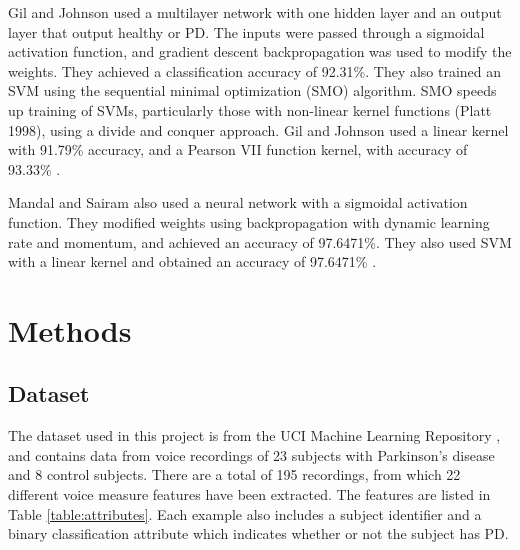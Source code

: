 \documentclass[draftcopy]{srpaper}
\begin{document}
Gil and Johnson used a multilayer network with one hidden layer
and an output layer that output healthy or PD. The inputs were passed
through a sigmoidal activation function, and gradient descent
backpropagation was used to modify the weights. They achieved a
classification accuracy of 92.31\%.
They also trained an SVM using the sequential minimal
optimization (SMO) algorithm. SMO speeds up training
of SVMs, particularly those with non-linear kernel functions (Platt
1998), using a divide and conquer approach. Gil and Johnson used a
linear kernel with 91.79\% accuracy, and a Pearson VII function
kernel, with accuracy of 93.33\% \cite{GJ70}.

Mandal and Sairam also used a neural network with a sigmoidal activation function. They modified weights using backpropagation with dynamic
learning rate and momentum, and achieved an accuracy of 97.6471\%.
They also used SVM with a linear kernel and obtained an
accuracy of 97.6471\% \cite{MS12}.

 \chapter{Methods}
 \label{Chapter:Three}

\section{Dataset}
The dataset used in this project is from the UCI Machine Learning
Repository \cite{Bache+Lichman:2013}, and contains data from voice
recordings of 23
subjects with Parkinson's disease and 8 control subjects. There are a
total of 195 recordings, from which 22 different voice
measure features have been extracted. The features are listed in
Table \ref{table:attributes}. Each example also includes a subject
identifier and a binary classification attribute which
indicates whether or not the subject has PD.
\end{document}
